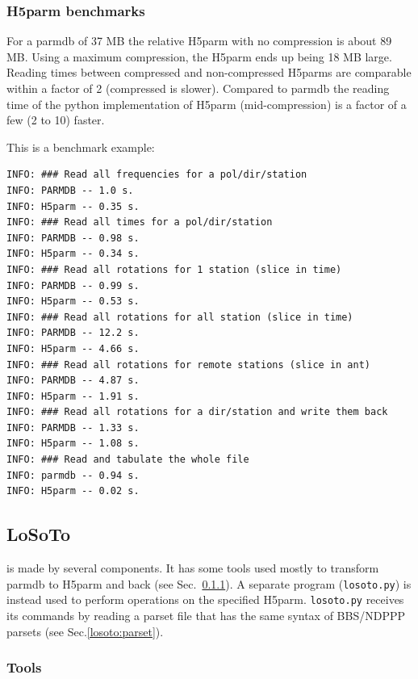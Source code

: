 \documentclass[]{article}
\begin{document}
\subsubsection{H5parm benchmarks}

For a parmdb of 37 MB the relative H5parm with no compression is about 89 MB. Using a maximum compression, the H5parm ends up being 18 MB large. Reading times between compressed and non-compressed H5parms are comparable within a factor of 2 (compressed is slower). Compared to parmdb the reading time of the python implementation of H5parm (mid-compression) is a factor of a few (2 to 10) faster.

This is a benchmark example:

\begin{verbatim}
INFO: ### Read all frequencies for a pol/dir/station
INFO: PARMDB -- 1.0 s.
INFO: H5parm -- 0.35 s.
INFO: ### Read all times for a pol/dir/station
INFO: PARMDB -- 0.98 s.
INFO: H5parm -- 0.34 s.
INFO: ### Read all rotations for 1 station (slice in time)
INFO: PARMDB -- 0.99 s.
INFO: H5parm -- 0.53 s.
INFO: ### Read all rotations for all station (slice in time)
INFO: PARMDB -- 12.2 s.
INFO: H5parm -- 4.66 s.
INFO: ### Read all rotations for remote stations (slice in ant)
INFO: PARMDB -- 4.87 s.
INFO: H5parm -- 1.91 s.
INFO: ### Read all rotations for a dir/station and write them back
INFO: PARMDB -- 1.33 s.
INFO: H5parm -- 1.08 s.
INFO: ### Read and tabulate the whole file
INFO: parmdb -- 0.94 s.
INFO: H5parm -- 0.02 s.
\end{verbatim}

\subsection{LoSoTo}
\label{losoto:overview}

\losoto{} is made by several components. It has some tools used mostly to transform parmdb to H5parm and back (see Sec.~\ref{losoto:tools}). A separate program (\texttt{losoto.py}) is instead used to perform operations on the specified H5parm. \texttt{losoto.py} receives its commands by reading a parset file that has the same syntax of BBS/NDPPP parsets (see Sec.\ref{losoto:parset}).

\subsubsection{Tools}
\label{losoto:tools}
\end{document}
